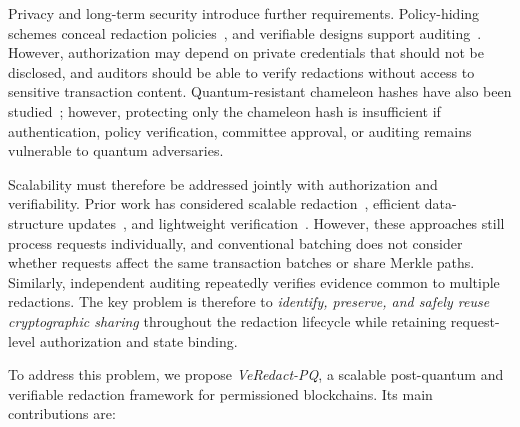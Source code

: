 \documentclass[lettersize,journal]{IEEEtran}
\begin{document}
Privacy and long-term security introduce further requirements.
Policy-hiding schemes conceal redaction
policies~\cite{ref4,ref18,ref31,ref34}, and verifiable designs support
auditing~\cite{ref13,ref20,ref33}. However, authorization may depend on
private credentials that should not be disclosed, and auditors should
be able to verify redactions without access to sensitive transaction
content. Quantum-resistant chameleon hashes have also been
studied~\cite{ref10,ref11,ref17,ref37}; however, protecting only the
chameleon hash is insufficient if authentication, policy verification,
committee approval, or auditing remains vulnerable to quantum
adversaries.

Scalability must therefore be addressed jointly with authorization and
verifiability. Prior work has considered scalable
redaction~\cite{ref14,ref21,ref26}, efficient data-structure
updates~\cite{ref23}, and lightweight verification~\cite{ref20}.
However, these approaches still process requests individually, and
conventional batching does not consider whether requests affect the same
transaction batches or share Merkle paths. Similarly, independent
auditing repeatedly verifies evidence common to multiple redactions.
The key problem is therefore to
\emph{identify, preserve, and safely reuse cryptographic sharing}
throughout the redaction lifecycle while retaining request-level
authorization and state binding.

To address this problem, we propose \emph{VeRedact-PQ}, a scalable
post-quantum and verifiable redaction framework for permissioned
blockchains. Its main contributions are:
\end{document}
